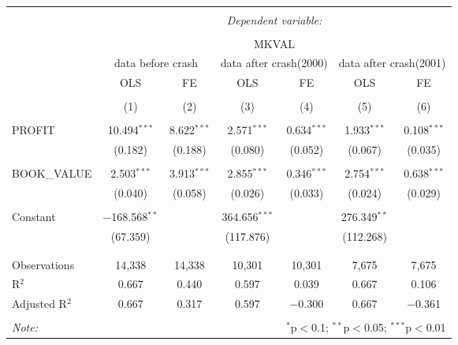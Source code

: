 \documentclass[11pt, letterpaper]{article}
\begin{document}
\begin{table}[!htbp] \centering 
  \caption{} 
  \label{2} 
\begin{tabular}{@{\extracolsep{5pt}}lcccccc} 
\\[-1.8ex]\hline 
\hline \\[-1.8ex] 
 & \multicolumn{6}{c}{\textit{Dependent variable:}} \\ 
\cline{2-7} 
\\[-1.8ex] & \multicolumn{6}{c}{MKVAL} \\ 
& \multicolumn{2}{c}{data before crash} & \multicolumn{2}{c}{data after crash(2000)}  & \multicolumn{2}{c}{data after crash(2001)}      \\
 &  OLS & FE & OLS & FE & OLS & FE \\ 
\\[-1.8ex] & (1) & (2) & (3) & (4) & (5) & (6)\\ 
\hline \\[-1.8ex] 
 PROFIT & 10.494$^{***}$ & 8.622$^{***}$ & 2.571$^{***}$ & 0.634$^{***}$ & 1.933$^{***}$ & 0.108$^{***}$ \\ 
  & (0.182) & (0.188) & (0.080) & (0.052) & (0.067) & (0.035) \\ 
  & & & & & & \\ 
 BOOK\_VALUE & 2.503$^{***}$ & 3.913$^{***}$ & 2.855$^{***}$ & 0.346$^{***}$ & 2.754$^{***}$ & 0.638$^{***}$ \\ 
  & (0.040) & (0.058) & (0.026) & (0.033) & (0.024) & (0.029) \\ 
  & & & & & & \\ 
 Constant & $-$168.568$^{**}$ &  & 364.656$^{***}$ &  & 276.349$^{**}$ &  \\ 
  & (67.359) &  & (117.876) &  & (112.268) &  \\ 
  & & & & & & \\ 
\hline \\[-1.8ex] 
Observations & 14,338 & 14,338 & 10,301 & 10,301 & 7,675 & 7,675 \\ 
R$^{2}$ & 0.667 & 0.440 & 0.597 & 0.039 & 0.667 & 0.106 \\ 
Adjusted R$^{2}$ & 0.667 & 0.317 & 0.597 & $-$0.300 & 0.667 & $-$0.361 \\ 
\hline 
\hline \\[-1.8ex] 
\textit{Note:}  & \multicolumn{6}{r}{$^{*}$p$<$0.1; $^{**}$p$<$0.05; $^{***}$p$<$0.01} \\ 
\end{tabular} 
\end{table}
\end{document}
